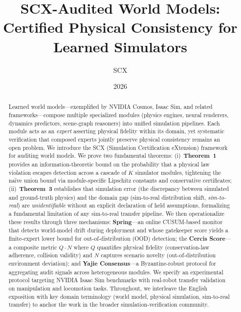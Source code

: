 \documentclass[11pt,twocolumn]{article}
\title{\textbf{SCX-Audited World Models:}\\[4pt]
       \large Certified Physical Consistency for Learned Simulators}
\author{SCX}
\date{2026}
\theoremstyle{definition}
\begin{document}
\maketitle

\begin{abstract}
Learned world models---exemplified by NVIDIA Cosmos, Isaac Sim, and related
frameworks---compose multiple specialized modules (physics engines, neural
renderers, dynamics predictors, scene-graph reasoners) into unified simulation
pipelines.  Each module acts as an \emph{expert} asserting physical fidelity
within its domain, yet systematic verification that composed experts jointly
preserve physical consistency remains an open problem.  We introduce the SCX
(Simulation Certification eXtension) framework for auditing world models.
We prove two fundamental theorems: (i)~\textbf{Theorem~1} provides an
information-theoretic bound on the probability that a physical law violation
escapes detection across a cascade of $K$ simulator modules, tightening the
na\"ive union bound via module-specific Lipschitz constants and conservative
certificates; (ii)~\textbf{Theorem~3} establishes that simulation error (the
discrepancy between simulated and ground-truth physics) and the domain gap
(sim-to-real distribution shift, \emph{sim-to-real})
are \emph{unidentifiable} without an explicit declaration of held assumptions,
formalizing a fundamental limitation of any sim-to-real transfer pipeline.  We
then operationalize these results through three mechanisms:
\textbf{Spring}---an online CUSUM-based monitor that detects world-model drift
during deployment and whose gatekeeper score yields a finite-expert lower
bound for out-of-distribution (OOD) detection; the \textbf{Cercis Score}---a
composite metric $Q \cdot N$ where $Q$ quantifies physical fidelity
(conservation-law adherence, collision validity) and $N$ captures scenario
novelty (out-of-distribution environment deviation); and \textbf{Yajie
Consensus}---a Byzantine-robust protocol for
aggregating audit signals across heterogeneous modules.  We specify an
experimental protocol targeting NVIDIA Isaac Sim benchmarks with real-robot
transfer validation on manipulation and locomotion tasks.  Throughout, we interleave the English exposition with key domain
terminology (world model, physical simulation,
sim-to-real transfer) to anchor the work in the broader
simulation-verification community.
\end{abstract}

\end{document}
